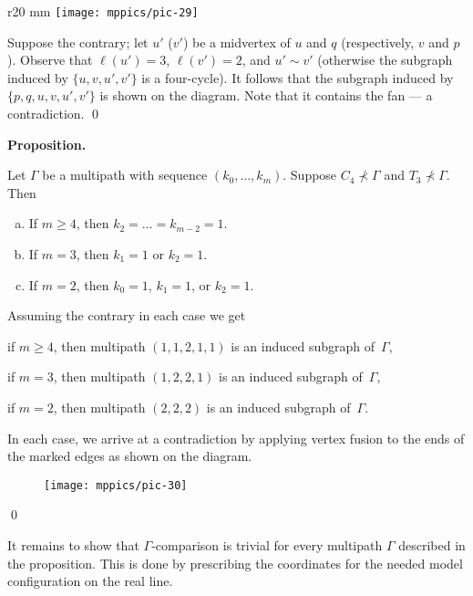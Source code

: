 \documentclass{article}
\def\parit#1{\medskip\noindent{\it #1}}
\def\qeds{\qed\par\medskip}
\def\qedsf{\vskip-6mm\qeds}
\newcounter{thm}[section]
\def\claim#1{\par\medskip\noindent\refstepcounter{thm}\hbox{\bf\boldmath #1.}
\it\ %
}
\def\endclaim{
\par\medskip}
\newenvironment{thm}{\claim}{\endclaim}
\begin{document}
\begin{wrapfigure}{r}{20 mm}
\vskip-8mm
\centering
\texttt{[image: mppics/pic-29]}
\vskip-2mm
\end{wrapfigure}

Suppose the contrary;
let $u'$ ($v'$) be a midvertex of $u$ and $q$ (respectively, $v$ and $p$ ).
Observe that $\ell(u')=3$, $\ell(v')=2$, and $u'\sim v'$ (otherwise the subgraph induced by $\{u,v,u',v'\}$ is a four-cycle).
It follows that the subgraph induced by $\{p,q,u,v,u',v'\}$ is shown on the diagram.
Note that it contains the fan --- a contradiction. 
\qeds




\begin{thm}{Proposition}
Let $\Gamma$ be a multipath with sequence $(k_0,\dots, k_m)$.
Suppose $C_4\nprec\Gamma$ and  $T_3\nprec\Gamma$.
Then 
\begin{enumerate}[(a)]
 \item\label{lem:multipath:5} If $m\geqslant 4$, then $k_2=\dots=k_{m-2}=1$.
 \item\label{lem:multipath:4} If $m= 3$, then $k_1=1$ or $k_2=1$.
 \item\label{lem:multipath:3} If $m= 2$, then $k_0=1$, $k_1=1$, or $k_2=1$.
\end{enumerate}

\end{thm}

\parit{Proof.} Assuming the contrary in each case we get

\parit{(\ref{lem:multipath:5})}
if $m\geqslant 4$, then multipath $(1,1,2,1,1)$ is an induced subgraph of~$\Gamma$,

\parit{(\ref{lem:multipath:4})}
if $m=3$, then multipath $(1,2,2,1)$ is an induced subgraph of~$\Gamma$,

\parit{(\ref{lem:multipath:3})}
if $m=2$, then multipath $(2,2,2)$ is an induced subgraph of~$\Gamma$.

In each case, we arrive at a contradiction by applying vertex fusion to the ends of the marked edges as shown on the diagram.

\begin{figure}[h!]
\centering
\texttt{[image: mppics/pic-30]}
\end{figure}
\qedsf


It remains to show that $\Gamma$-comparison is trivial for every multipath $\Gamma$ described in the proposition.
This is done by prescribing the coordinates for the needed model configuration on the real line.
\end{document}
